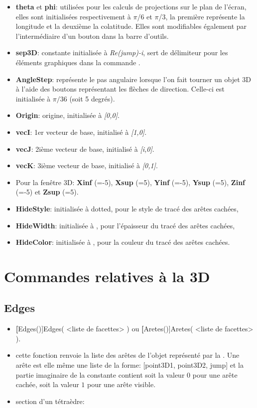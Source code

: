 \begin{itemize}
 \item \textbf{theta} et \textbf{phi}: utilisées pour les calculs de projections sur le plan de l'écran, elles sont initialisées respectivement à $\pi$/6 et $\pi$/3, la première représente la longitude et la deuxième la colatitude. Elles sont modifiables également par l'intermédiaire d'un bouton dans la barre d'outils.
 \item \textbf{sep3D}: constante initialisée à \textit{Re(jump)-i}, sert de délimiteur pour les éléments graphiques dans la commande .
 \item \textbf{AngleStep}: représente le pas angulaire lorsque l'on fait tourner un objet 3D à l'aide des boutons représentant les flèches de direction. Celle-ci est initialisée à $\pi/36$ (soit 5 degrés).
 \item \textbf{Origin}: origine, initialisée à \textsl{[0,0]}.
 \item \textbf{vecI}: 1er vecteur de base, initialisé à \textsl{[1,0]}.
 \item \textbf{vecJ}: 2ième vecteur de base, initialisé à \textsl{[i,0]}.
 \item \textbf{vecK}: 3ième vecteur de base, initialisé à \textsl{[0,1]}.
 \item Pour la fenêtre 3D: \textbf{Xinf} (=-5), \textbf{Xsup} (=5), \textbf{Yinf} (=-5), \textbf{Ysup} (=5), \textbf{Zinf} (=-5) et \textbf{Zsup} (=5). 
 \item \textbf{HideStyle}: initialisée à dotted, pour le style de tracé des arêtes cachées,
 \item \textbf{HideWidth}: initialisée à \Nil, pour l'épaisseur du tracé des arêtes cachées,
 \item \textbf{HideColor}: initialisée à \Nil, pour la couleur du tracé des arêtes cachées.
\end{itemize}

\section{Commandes relatives à la 3D}

\subsection{Edges}\label{cmdAretes}

\begin{itemize}
 \item \util \textbf[Edges()]{Edges( <liste de facettes> )} ou \textbf[Aretes()]{Aretes( <liste de facettes> )}.
 \item \desc cette fonction renvoie la liste des arêtes de l'objet représenté par la . Une arête est elle même une liste de la forme: [point3D1, point3D2, jump] et la partie imaginaire de la constante \jump contient soit la valeur $0$ pour une arête cachée, soit la valeur $1$ pour une arête visible.
 \item \exem section d'un tétraèdre:
\end{itemize}

